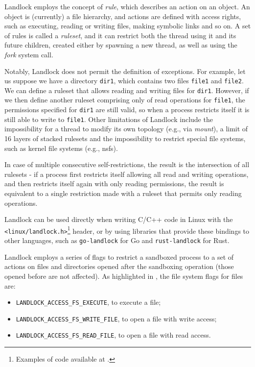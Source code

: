 Landlock employs the concept of \textit{rule}, which describes an action
on an object. An object is (currently) a file hierarchy, and actions are
defined with access rights, such as executing, reading or writing files, making
symbolic links and so on.
A set of rules is called a \textit{ruleset}, and it can restrict both the thread
using it and its future children, created either by spawning a new thread, as well
as using the \textit{fork} system call.

Notably, Landlock does not permit the definition of exceptions.
For example, let us suppose we have a directory \texttt{dir1}, which contains two files
\texttt{file1} and \texttt{file2}. We can define a ruleset that allows
reading and writing files for \texttt{dir1}.
However, if we then define another ruleset comprising only of read operations
for \texttt{file1}, the permissions specified for \texttt{dir1} are still
valid, so when a process restricts itself it is still able to write to \texttt{file1}.
Other limitations of Landlock include the impossibility for a thread to modify its own topology
(e.g., via \textit{mount}), a limit of 16 layers of stacked rulesets and the impossibility to
restrict special file systems, such as kernel file systems (e.g., nsfs).

In case of multiple consecutive self-restrictions, the result is the intersection
of all rulesets - if a process first restricts itself allowing all read and writing operations,
and then restricts itself again with only reading permissions, the result is equivalent
to a single restriction made with a ruleset that permits only reading operations.

Landlock can be used directly when writing C/C++ code in Linux with the
\texttt{<linux/landlock.h>}\footnote{Examples of code available at \cite{landlock-user-space}.}
header, or by using libraries that provide these bindings to other languages,
such as \texttt{go-landlock} \cite{go-landlock}
for Go and \texttt{rust-landlock} \cite{rust-landlock} for Rust.

Landlock employs a series of flags to restrict a sandboxed process to a set of actions on files and
directories opened after the sandboxing operation (those opened before are not affected).
As highlighted in \cite{landlock-user-space}, the file system flags for files are:
\begin{itemize}
  \item \texttt{LANDLOCK\_ACCESS\_FS\_EXECUTE}, to execute a file;
  \item \texttt{LANDLOCK\_ACCESS\_FS\_WRITE\_FILE}, to open a file with write access;
  \item \texttt{LANDLOCK\_ACCESS\_FS\_READ\_FILE}, to open a file with read access.
\end{itemize}

